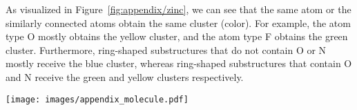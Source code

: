 As visualized in Figure~\ref{fig:appendix/zinc}, we can see that the same atom or the similarly connected atoms obtain the same cluster (color). For example, the atom type O mostly obtains the yellow cluster, and the atom type F obtains the green cluster. Furthermore, ring-shaped substructures that do not contain O or N mostly receive the blue cluster, whereas ring-shaped substructures that contain O and N receive the green and yellow clusters respectively.

\begin{figure*}[h]
    \centering
    \texttt{[image: images/appendix\_molecule.pdf]}
    \vskip -0.175in
    \caption{\textbf{Molecule Reconstruction Examples (Left):} Original molecules with the assigned cluster on each node represented as color, where cluster is generated from \emph{Graph Multiset Pooling} (GMPool). \textbf{(Right):} Reconstructed molecules. Red dotted circle indicates the incorrect atom prediction.}
    \label{fig:appendix/zinc}
\end{figure*}